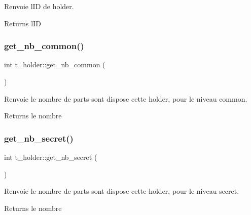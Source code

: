 Renvoie l\textquotesingle{}ID de holder. 

\begin{DoxyReturn}{Returns}
l\textquotesingle{}ID 
\end{DoxyReturn}
\mbox{\label{classt__holder_a00ab33ab1bbe0d29f2c0ade8f767d993}} 
\subsubsection{\texorpdfstring{get\+\_\+nb\+\_\+common()}{get\_nb\_common()}}
{\footnotesize\ttfamily int t\+\_\+holder\+::get\+\_\+nb\+\_\+common (\begin{DoxyParamCaption}{ }\end{DoxyParamCaption})}



Renvoie le nombre de parts sont dispose cette holder, pour le niveau common. 

\begin{DoxyReturn}{Returns}
le nombre 
\end{DoxyReturn}
\mbox{\label{classt__holder_a01e3dcac731099c4e41a5ea375c5bbc1}} 
\subsubsection{\texorpdfstring{get\+\_\+nb\+\_\+secret()}{get\_nb\_secret()}}
{\footnotesize\ttfamily int t\+\_\+holder\+::get\+\_\+nb\+\_\+secret (\begin{DoxyParamCaption}{ }\end{DoxyParamCaption})}



Renvoie le nombre de parts sont dispose cette holder, pour le niveau secret. 

\begin{DoxyReturn}{Returns}
le nombre 
\end{DoxyReturn}
\mbox{\label{classt__holder_aa7461956a8d02ec385f2c336e1625c0e}} 
